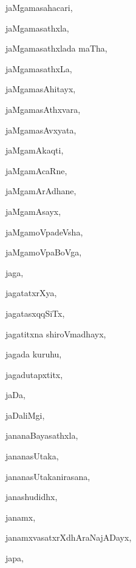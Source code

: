 \begin{multicols}{3}
{\noindent
{jaMgamasahacari}, \pageref{jaMgamasahacari}

\noindent
{jaMgamasathxla}, \pageref{jaMgamasathxla}

\noindent
{jaMgamasathxlada maTha}, \pageref{jaMgamasathxlada maTha}

\noindent
{jaMgamasathxLa}, \pageref{jaMgamasathxLa}

\noindent
{jaMgamasAhitayx}, \pageref{jaMgamasAhitayx}

\noindent
{jaMgamasAthxvara}, \pageref{jaMgamasAthxvara}

\noindent
{jaMgamasAvxyata}, \pageref{jaMgamasAvxyata}

\noindent
{jaMgamAkaqti}, \pageref{jaMgamAkaqti}

\noindent
{jaMgamAcaRne}, \pageref{jaMgamAcaRne}

\noindent
{jaMgamArAdhane}, \pageref{jaMgamArAdhane}

\noindent
{jaMgamAsayx}, \pageref{jaMgamAsayx}

\noindent
{jaMgamoVpadeVsha}, \pageref{jaMgamoVpadeVsha}

\noindent
{jaMgamoVpaBoVga}, \pageref{jaMgamoVpaBoVga}

\noindent
{jaga}, \pageref{jaga}

\noindent
{jagatatxrXya}, \pageref{jagatatxrXya}

\noindent
{jagatasxqqSiTx}, \pageref{jagatasxqqSiTx}

\noindent
{jagatitxna shiroVmadhayx}, \pageref{jagatitxna shiroVmadhayx}

\noindent
{jagada kuruhu}, \pageref{jagada kuruhu}

\noindent
{jagadutapxtitx}, \pageref{jagadutapxtitx}

\noindent
{jaDa}, \pageref{jaDa}

\noindent
{jaDaliMgi}, \pageref{jaDaliMgi}

\noindent
{jananaBayasathxla}, \pageref{jananaBayasathxla}

\noindent
{jananasUtaka}, \pageref{jananasUtaka}

\noindent
{jananasUtakanirasana}, \pageref{jananasUtakanirasana}

\noindent
{janashudidhx}, \pageref{janashudidhx}

\noindent
{janamx}, \pageref{janamx}

\noindent
{janamxvasatxrXdhAraNajADayx}, \pageref{janamxvasatxrXdhAraNajADayx}

\noindent
{japa}, \pageref{japa}

}
\end{multicols}
